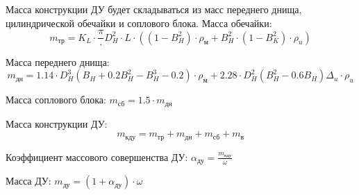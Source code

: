  Масса конструкции ДУ будет складываться из масс переднего днища, цилиндрической обечайки и соплового блока.
 Масса обечайки:
 $$m_\text{тр}=K_L \cdot \dfrac{\pi} \cdot D_H^2 \cdot L \cdot \left((1- B_H^2 ) \cdot \rho_\text{м}+ B_H^2 \cdot (1- B_K^2 ) \cdot \rho_u \right)$$

 Масса переднего днища:
 $$m_\text{дн}=1.14 \cdot  D_H ^3 (B_H+0.2B_H^2- B_H ^3-0.2) \cdot \rho_\text{м}+2.28 \cdot  D_H ^2 (B_H^2-0.6B_H)\Delta _u \cdot \rho_u$$

 Масса соплового блока:			$	m_\text{сб}=1.5 \cdot m_\text{дн}$

 Масса конструкции ДУ:				
 $$m_\text{кду}=m_\text{тр}+m_\text{дн}+m_\text{сб}+ m_\text{в}$$

 Коэффициент массового совершенства ДУ:		$\alpha_\text{ду}=\frac{m_\text{кду}}{\omega}$

 Масса ДУ:					$	m_\text{ду}=(1+\alpha_\text{ду}) \cdot  \omega $

\clearpage

